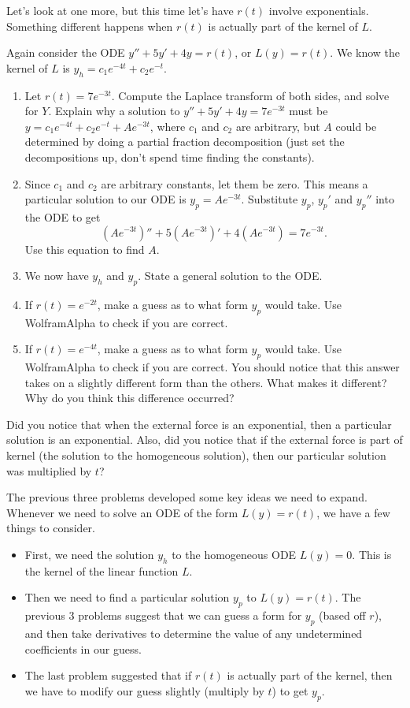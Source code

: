 Let's look at one more, but this time let's have $r(t)$ involve exponentials. Something different happens when $r(t)$ is actually part of the kernel of $L$. 
\begin{problem}
Again consider the ODE $y''+5y'+4y=r(t)$, or $L(y)=r(t)$. We know the kernel of $L$ is $y_h = c_1 e^{-4t}+c_2e^{-t}$.\begin{enumerate}
 \item Let $r(t)=7e^{-3t}$.  Compute the Laplace transform of both sides, and solve for $Y$. Explain why a solution to $y''+5y'+4y=7e^{-3t}$ must be $y=c_1 e^{-4t}+c_2e^{-t}+Ae^{-3t}$, where $c_1$ and $c_2$ are arbitrary, but $A$ could be determined by doing a partial fraction decomposition (just set the decompositions up, don't spend time finding the constants).
 \item Since $c_1$ and $c_2$ are arbitrary constants, let them be zero. This means a particular solution to our ODE is $y_p=Ae^{-3t}$.  Substitute $y_p$, $y_p'$ and $y_p''$ into the ODE to get
$$
(Ae^{-3t})'' + 5(Ae^{-3t})'+4(Ae^{-3t})=7e^{-3t}
.$$ Use this equation to find $A$.
 \item We now have $y_h$ and $y_p$. State a general solution to the ODE. 
 \item If $r(t) = e^{-2t}$, make a guess as to what form $y_p$ would take.  Use WolframAlpha to check if you are correct. 
 \item If $r(t) = e^{-4t}$, make a guess as to what form $y_p$ would take.  Use WolframAlpha to check if you are correct. You should notice that this answer takes on a slightly different form than the others. What makes it different? Why do you think this difference occurred?
\end{enumerate}
 
\end{problem}
Did you notice that when the external force is an exponential, then a particular solution is an exponential. Also, did you notice that if the external force is part of kernel (the solution to the homogeneous solution), then our particular solution was multiplied by $t$?

The previous three problems developed some key ideas we need to expand. Whenever we need to solve an ODE of the form $L(y)=r(t)$, we have a few things to consider.
\begin{itemize}
 \item First, we need the solution $y_h$ to the homogeneous ODE $L(y)=0$.  This is the kernel of the linear function $L$. 
 \item Then we need to find a particular solution $y_p$ to $L(y)=r(t)$. The previous 3 problems suggest that we can guess a form for $y_p$ (based off $r$), and then take derivatives to determine the value of any undetermined coefficients in our guess. 
 \item The last problem suggested that if $r(t)$ is actually part of the kernel, then we have to modify our guess slightly (multiply by $t$) to get $y_p$. 
\end{itemize}

